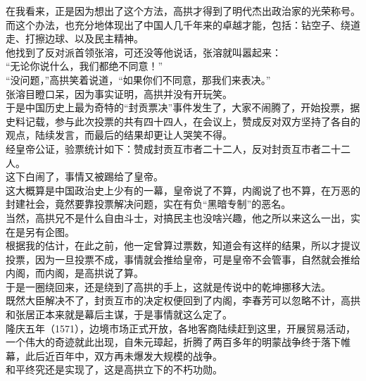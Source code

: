 \begin{multicols}{\theparacolNo}
在我看来，正是因为想出了这个方法，高拱才得到了明代杰出政治家的光荣称号。而这个办法，也充分地体现出了中国人几千年来的卓越才能，包括：钻空子、绕道走、打擦边球、以及民主精神。\\

他找到了反对派首领张溶，可还没等他说话，张溶就叫嚣起来：\\

“无论你说什么，我们都绝不同意！”\\

“没问题，”高拱笑着说道，“如果你们不同意，那我们来表决。”\\

张溶目瞪口呆，因为事实证明，高拱并没有开玩笑。\\

于是中国历史上最为奇特的“封贡票决”事件发生了，大家不闹腾了，开始投票，据史料记载，参与此次投票的共有四十四人，在会议上，赞成反对双方坚持了各自的观点，陆续发言，而最后的结果却更让人哭笑不得。\\

经皇帝公证，验票统计如下：赞成封贡互市者二十二人，反对封贡互市者二十二人。\\

这下白闹了，事情又被踢给了皇帝。\\

这大概算是中国政治史上少有的一幕，皇帝说了不算，内阁说了也不算，在万恶的封建社会，竟然要靠投票解决问题，实在有负“黑暗专制”的恶名。\\

当然，高拱兄不是什么自由斗士，对搞民主也没啥兴趣，他之所以来这么一出，实在是另有企图。\\

根据我的估计，在此之前，他一定曾算过票数，知道会有这样的结果，所以才提议投票，因为一旦投票不成，事情就会推给皇帝，可是皇帝不会管事，自然就会推给内阁，而内阁，是高拱说了算。\\

于是一圈绕回来，还是绕到了高拱的手上，这就是传说中的乾坤挪移大法。\\

既然大臣解决不了，封贡互市的决定权便回到了内阁，李春芳可以忽略不计，高拱和张居正本来就是幕后主谋，于是事情就这么定了。\\

隆庆五年（1571），边境市场正式开放，各地客商陆续赶到这里，开展贸易活动，一个伟大的奇迹就此出现，自朱元璋起，折腾了两百多年的明蒙战争终于落下帷幕，此后近百年中，双方再未爆发大规模的战争。\\

和平终究还是实现了，这是高拱立下的不朽功勋。\\

\ifnum{}
	\end{multicols}
\fi
\newpage

